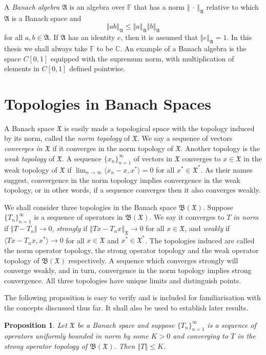 \documentclass[mmath,12pt]{unswthesis}   %
\newcommand{\C}{\mathbb{C}}
\newcommand{\F}{\mathbb{F}}
\newcommand{\B}{\mathfrak{B}}
\newcommand{\X}{\mathfrak{X}}
\def\ip<#1,#2>{\langle #1,#2 \rangle}
\def\norm#1{\left \Vert #1 \right \Vert}
\newtheorem{proposition}[theorem]{Proposition}
\numberwithin{equation}{section}
\begin{document}
A {\em Banach algebra} $\mathfrak{A}$ is an algebra over $\F$ that has a norm
$\norm{\,\cdot\,}_{\mathfrak{A}}$ relative to which $\mathfrak{A}$ is a Banach
space and
\[\norm{ab}_{\mathfrak{A}}\leq\norm{a}_{\mathfrak{A}}\norm{b}_{\mathfrak{A}}\]
for all $a,b\in\mathfrak{A}$. If $\mathfrak{A}$ has an identity $e$, then it is
assumed that $\norm{e}_{\mathfrak{A}}=1$. In this thesis we shall always take
$\F$ to be $\C$. An example of a Banach algebra is the space $C[0,1]$ equipped
with the supremum norm, with multiplication of elements in $C[0,1]$ defined
pointwise.


\section{Topologies in Banach Spaces}\label{topologies}

A Banach space $\X$ is easily made a topological space with the topology induced
by its norm, called the {\em norm topology} of $\X$. We say a sequence of
vectors {\em converges in $\X$} if it converges in the norm topology of $\X$.
Another
topology is the {\em weak topology} of $\X$. A sequence $\{x_n\}_{n=1}^{\infty}$
of vectors in $\X$ converges to $x\in\X$ in the weak topology of $\X$ if
$\lim_{n\rightarrow\infty}\ip<x_n-x,x^*>=0$ for all $x^*\in\X^*$. As their names
suggest, convergence in the norm topology implies convergence in the weak
topology, or in other words, if a sequence converges then it also converges
weakly.

We shall consider three topologies in the Banach space $\B(\X)$.
Suppose $\{T_n\}_{n=1}^{\infty}$ is a sequence of operators in $\B(\X)$.
We say it
converges to $T$ {\em in norm} if $\norm{T-T_n}\rightarrow 0$, {\em strongly} if
$\norm{Tx-T_nx}_{\X}\rightarrow 0$ for all $x\in\X$, and {\em weakly} if
$\ip<Tx-T_nx,x^*>\rightarrow 0$ for all $x\in\X$ and $x^*\in\X^*$. The 
topologies
induced are called the norm operator topology, the strong operator topology and
the weak
operator topology of $\B(\X)$ respectively. A sequence which converges strongly
will converge weakly, and in turn, convergence in the norm topology implies
strong convergence. All three topologies have unique limits and distinguish
points.

The following proposition is easy to verify and is included for familiarisation
with the concepts discussed thus far. It shall also be used to establish later
results.

\begin{proposition}\label{SOT convergence}
Let $\X$ be a Banach space and suppose $\{T_n\}_{n=1}^{\infty}$ is a sequence of
operators uniformly bounded in norm by some $K>0$ and converging to $T$
in the strong operator topology of $\B(\X)$. Then $\norm{T}\leq
K$.
\end{proposition}
\end{document}
